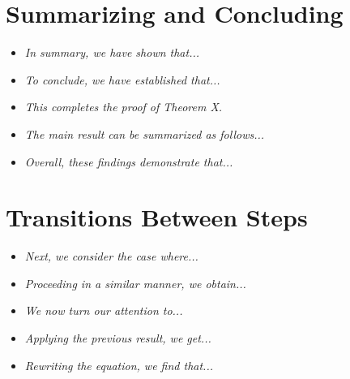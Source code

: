 \documentclass[10pt,letterpaper,oneside,reqno]{amsart}
\begin{document}
\begin{multicols}{2}
        \section*{Summarizing and Concluding}
        \begin{itemize}
            \item \textit{In summary, we have shown that...}
            \item \textit{To conclude, we have established that...}
            \item \textit{This completes the proof of Theorem X.}
            \item \textit{The main result can be summarized as follows...}
            \item \textit{Overall, these findings demonstrate that...}
        \end{itemize}


        \section*{Transitions Between Steps}
        \begin{itemize}
            \item \textit{Next, we consider the case where...}
            \item \textit{Proceeding in a similar manner, we obtain...}
            \item \textit{We now turn our attention to...}
            \item \textit{Applying the previous result, we get...}
            \item \textit{Rewriting the equation, we find that...}
        \end{itemize}
    \end{multicols}

    \clearpage
\end{document}
